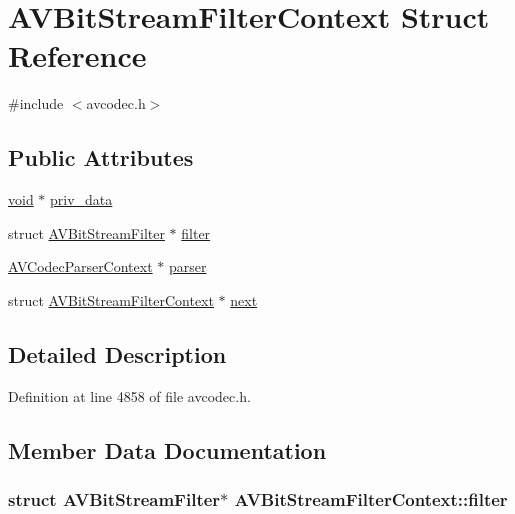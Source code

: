 \hypertarget{struct_a_v_bit_stream_filter_context}{}\section{A\+V\+Bit\+Stream\+Filter\+Context Struct Reference}
\label{struct_a_v_bit_stream_filter_context}


{\ttfamily \#include $<$avcodec.\+h$>$}

\subsection*{Public Attributes}
\begin{DoxyCompactItemize}
\item 
\hyperlink{sound_8c_ae35f5844602719cf66324f4de2a658b3}{void} $\ast$ \hyperlink{struct_a_v_bit_stream_filter_context_a52be23186f336ec2dabea3ff06b2c28d}{priv\+\_\+data}
\item 
struct \hyperlink{struct_a_v_bit_stream_filter}{A\+V\+Bit\+Stream\+Filter} $\ast$ \hyperlink{struct_a_v_bit_stream_filter_context_ae3a452c97019b6868bbbded7f18b06e5}{filter}
\item 
\hyperlink{struct_a_v_codec_parser_context}{A\+V\+Codec\+Parser\+Context} $\ast$ \hyperlink{struct_a_v_bit_stream_filter_context_aef526b29a519eff27dc47d0d2fb31157}{parser}
\item 
struct \hyperlink{struct_a_v_bit_stream_filter_context}{A\+V\+Bit\+Stream\+Filter\+Context} $\ast$ \hyperlink{struct_a_v_bit_stream_filter_context_a65bd58b3ccc448c497f69c413c2703b6}{next}
\end{DoxyCompactItemize}


\subsection{Detailed Description}


Definition at line 4858 of file avcodec.\+h.



\subsection{Member Data Documentation}
\subsubsection[{\texorpdfstring{filter}{filter}}]{\setlength{\rightskip}{0pt plus 5cm}struct {\bf A\+V\+Bit\+Stream\+Filter}$\ast$ A\+V\+Bit\+Stream\+Filter\+Context\+::filter}\hypertarget{struct_a_v_bit_stream_filter_context_ae3a452c97019b6868bbbded7f18b06e5}{}\label{struct_a_v_bit_stream_filter_context_ae3a452c97019b6868bbbded7f18b06e5}


